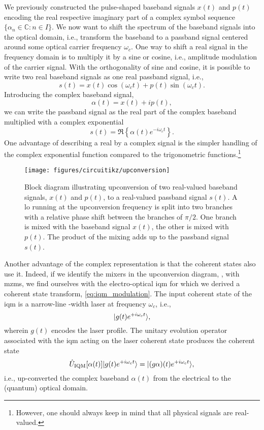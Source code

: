 We previously constructed the pulse-shaped baseband signals $x(t)$ and $p(t)$ encoding the real respective imaginary part of a complex symbol sequence $\{\alpha_n\in\mathbb{C}\colon n\in I\}$.
We now want to shift the spectrum of the baseband signals into the optical domain, i.e., transform the baseband to a passband signal centered around some optical carrier frequency $\omega_c$.
One way to shift a real signal in the frequency domain is to multiply it by a sine or cosine, i.e., amplitude modulation of the carrier signal.
With the orthogonality of sine and cosine, it is possible to write two real baseband signals as one real passband signal, i.e.,
\begin{equation}
	s(t)
	=
	x(t)
	\cos(\omega_ct)
	+
	p(t)
	\sin(\omega_ct)
	.
\end{equation}
Introducing the complex baseband signal,
\begin{equation}
	\alpha(t)
	=
	x(t)
	+
	ip(t)
	,
\end{equation}
we can write the passband signal as the real part of the complex baseband multiplied with a complex exponential
\begin{equation}
	s(t)
	=
	\Re\left\{
		\alpha(t)
		e^{-i\omega_ct}
	\right\}
	.
	\label{eq:real_complex_passband}
\end{equation}
One advantage of describing a real by a complex signal is the simpler handling of the complex exponential function compared to the trigonometric functions.\footnote{However, one should always keep in mind that all physical signals are real-valued.}
\begin{figure}[htb]
	\centering
	\texttt{[image: figures/circuitikz/upconversion]}
	\caption{Block diagram illustrating upconversion of two real-valued baseband signals, $x(t)$ and $p(t)$, to a real-valued passband signal $s(t)$. A \gls{lo} running at the upconversion frequency is split into two branches with a relative phase shift between the branches of $\pi/2$. One branch is mixed with the baseband signal $x(t)$, the other is mixed with $p(t)$. The product of the mixing adds up to the passband signal $s(t)$.}\label{fig:upconversion_block}
\end{figure}
Another advantage of the complex representation is that the coherent states also use it.
Indeed, if we identify the mixers in the upconversion diagram, , with \gls{mzm}s, we find ourselves with the electro-optical \gls{iqm} for which we derived a coherent state transform, \cref{eq:iqm_modulation}.
The input coherent state of the \gls{iqm} is a narrow-line -width laser at frequency $\omega_c$, i.e.,
\begin{equation}
	\lvert g(t)e^{+i\omega_ct}\rangle
	,
\end{equation}
wherein $g(t)$ encodes the laser profile.
The unitary evolution operator associated with the \gls{iqm} acting on the laser coherent state produces the coherent state
\begin{equation}
	\hat{U}_\text{IQM}[\alpha(t)]
	\lvert g(t)e^{+i\omega_ct}\rangle
	=
	\lvert(g\alpha)(t)e^{+i\omega_ct}\rangle
	,
\end{equation}
i.e., up-converted the complex baseband $\alpha(t)$ from the electrical to the (quantum) optical domain.